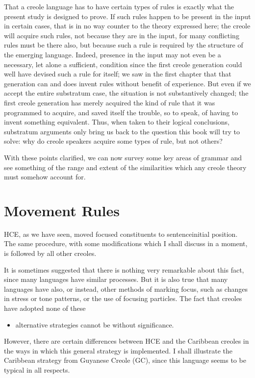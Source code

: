 That a creole language has to have certain types of rules is
exactly what the present study is designed to prove. If such rules happen to be present in the input in certain cases, that is in no way counter to the theory expressed here; the creole will acquire such rules, not because they are in the input, for many conflicting rules must be there also, but because such a rule is required by the struc\-ture of the emerging language. Indeed, presence in the input may not even be a necessary, let alone a sufficient, condition since the first creole generation could well have devised such a rule for itself; we saw in the first chapter that that generation can and does invent rules without benefit of experience. But even if we accept the entire sub\-stratum case, the situation is not substantively changed; the first creole generation has merely acquired the kind of rule that it was programmed to acquire, and saved itself the trouble, so to speak, of having to invent something equivalent. Thus, when taken to their logical conclusions, substratum arguments only bring us back to the question this book will try to solve: why do creole speakers acquire some types of rule, but not others?

With these points clarified, we can now survey some key areas of grammar and see something of the range and extent of the similarities which any creole theory must somehow account for.

\section{Movement Rules}

HCE, as we have seen, moved focused constituents to sentence\-initial position. The same procedure, with some modifications which I shall discuss in a moment, is followed by all other creoles.

It is sometimes suggested that there is nothing very remarkable about this fact, since many languages have similar processes. But it is also true that many languages have also, or instead, other methods of marking focus, such as changes in stress or tone patterns, or the use of focusing particles. The fact that creoles have adopted none of these

\begin{itemize}
\item alternative strategies cannot be without significance.
\end{itemize}

However, there are certain differences between HCE and the Caribbean creoles in the ways in which this general strategy is imple\-mented. I shall illustrate the Caribbean strategy from Guyanese Creole (GC), since this language seems to be typical in all respects.

